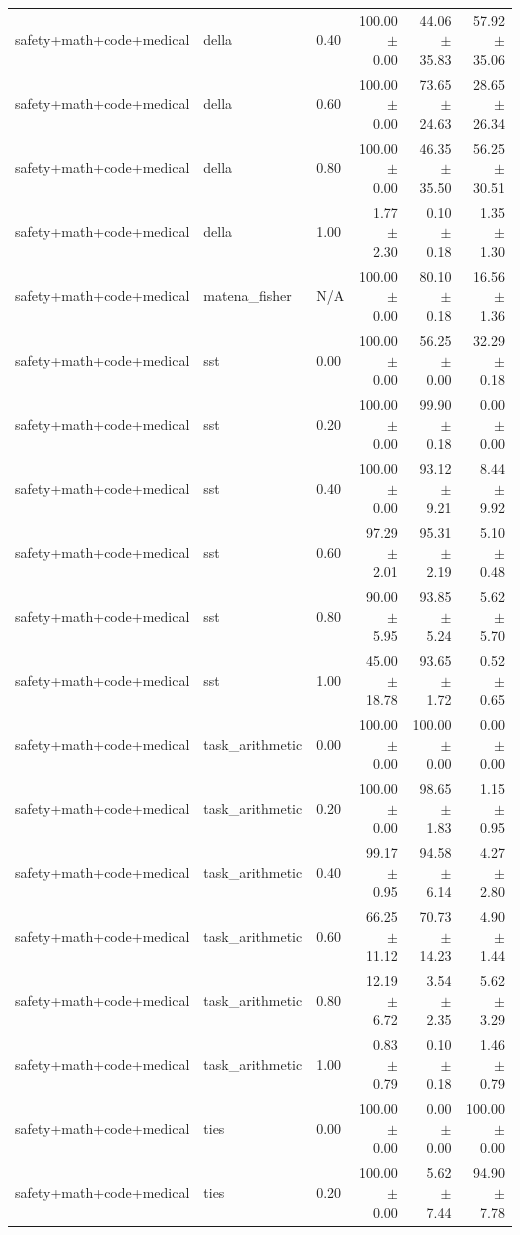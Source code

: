\documentclass{article}
\begin{document}
\begin{table}[H]
{\begin{tabular}{lllrrr}
safety+math+code+medical & della & 0.40 & 100.00 $\pm$ 0.00 & 44.06 $\pm$ 35.83 & 57.92 $\pm$ 35.06 \\
safety+math+code+medical & della & 0.60 & 100.00 $\pm$ 0.00 & 73.65 $\pm$ 24.63 & 28.65 $\pm$ 26.34 \\
safety+math+code+medical & della & 0.80 & 100.00 $\pm$ 0.00 & 46.35 $\pm$ 35.50 & 56.25 $\pm$ 30.51 \\
safety+math+code+medical & della & 1.00 & 1.77 $\pm$ 2.30 & 0.10 $\pm$ 0.18 & 1.35 $\pm$ 1.30 \\
safety+math+code+medical & matena\_fisher & N/A & 100.00 $\pm$ 0.00 & 80.10 $\pm$ 0.18 & 16.56 $\pm$ 1.36 \\
safety+math+code+medical & sst & 0.00 & 100.00 $\pm$ 0.00 & 56.25 $\pm$ 0.00 & 32.29 $\pm$ 0.18 \\
safety+math+code+medical & sst & 0.20 & 100.00 $\pm$ 0.00 & 99.90 $\pm$ 0.18 & 0.00 $\pm$ 0.00 \\
safety+math+code+medical & sst & 0.40 & 100.00 $\pm$ 0.00 & 93.12 $\pm$ 9.21 & 8.44 $\pm$ 9.92 \\
safety+math+code+medical & sst & 0.60 & 97.29 $\pm$ 2.01 & 95.31 $\pm$ 2.19 & 5.10 $\pm$ 0.48 \\
safety+math+code+medical & sst & 0.80 & 90.00 $\pm$ 5.95 & 93.85 $\pm$ 5.24 & 5.62 $\pm$ 5.70 \\
safety+math+code+medical & sst & 1.00 & 45.00 $\pm$ 18.78 & 93.65 $\pm$ 1.72 & 0.52 $\pm$ 0.65 \\
safety+math+code+medical & task\_arithmetic & 0.00 & 100.00 $\pm$ 0.00 & 100.00 $\pm$ 0.00 & 0.00 $\pm$ 0.00 \\
safety+math+code+medical & task\_arithmetic & 0.20 & 100.00 $\pm$ 0.00 & 98.65 $\pm$ 1.83 & 1.15 $\pm$ 0.95 \\
safety+math+code+medical & task\_arithmetic & 0.40 & 99.17 $\pm$ 0.95 & 94.58 $\pm$ 6.14 & 4.27 $\pm$ 2.80 \\
safety+math+code+medical & task\_arithmetic & 0.60 & 66.25 $\pm$ 11.12 & 70.73 $\pm$ 14.23 & 4.90 $\pm$ 1.44 \\
safety+math+code+medical & task\_arithmetic & 0.80 & 12.19 $\pm$ 6.72 & 3.54 $\pm$ 2.35 & 5.62 $\pm$ 3.29 \\
safety+math+code+medical & task\_arithmetic & 1.00 & 0.83 $\pm$ 0.79 & 0.10 $\pm$ 0.18 & 1.46 $\pm$ 0.79 \\
safety+math+code+medical & ties & 0.00 & 100.00 $\pm$ 0.00 & 0.00 $\pm$ 0.00 & 100.00 $\pm$ 0.00 \\
safety+math+code+medical & ties & 0.20 & 100.00 $\pm$ 0.00 & 5.62 $\pm$ 7.44 & 94.90 $\pm$ 7.78 \\

\end{tabular}}
\end{table}
\end{document}
